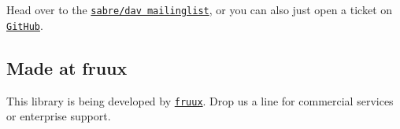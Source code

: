 Head over to the \href{http://groups.google.com/group/sabredav-discuss}{\tt sabre/dav mailinglist}, or you can also just open a ticket on \href{https://github.com/fruux/sabre-event/issues/}{\tt Git\+Hub}.

\subsection*{Made at fruux }

This library is being developed by \href{https://fruux.com/}{\tt fruux}. Drop us a line for commercial services or enterprise support. 